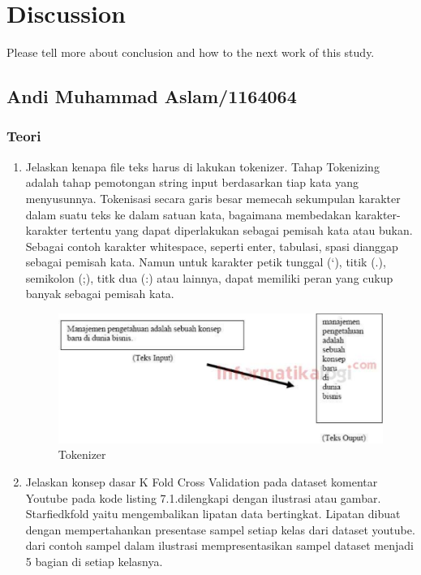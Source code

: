 \chapter{Discussion}
Please tell more about conclusion and how to the next work of this study.

\section{Andi Muhammad Aslam/1164064}
\subsection{Teori}
\begin{enumerate}
\item Jelaskan kenapa file teks harus di lakukan tokenizer.
\subitem Tahap Tokenizing adalah tahap pemotongan string input berdasarkan tiap kata yang menyusunnya. Tokenisasi secara garis besar memecah sekumpulan karakter dalam suatu teks ke dalam satuan kata, bagaimana membedakan karakter-karakter tertentu yang dapat diperlakukan sebagai pemisah kata atau bukan. Sebagai contoh karakter whitespace, seperti enter, tabulasi, spasi dianggap sebagai pemisah kata. Namun untuk karakter petik tunggal (‘), titik (.), semikolon (;), titk dua (:) atau lainnya, dapat memiliki peran yang cukup banyak sebagai pemisah kata.
\begin{figure}[!htbp]
	\centerline{\includegraphics[width=1\textwidth]{figures/andi/7-1.PNG}}
	\caption{Tokenizer}
	\label{Teori}
\end{figure}

\item Jelaskan konsep dasar K Fold Cross Validation pada dataset komentar Youtube pada kode listing 7.1.dilengkapi dengan ilustrasi atau gambar.
\subitem Starfiedkfold yaitu mengembalikan lipatan data bertingkat. Lipatan dibuat dengan mempertahankan presentase sampel setiap kelas dari dataset youtube. dari contoh sampel dalam ilustrasi mempresentasikan sampel dataset menjadi 5 bagian di setiap kelasnya.


\end{enumerate}
